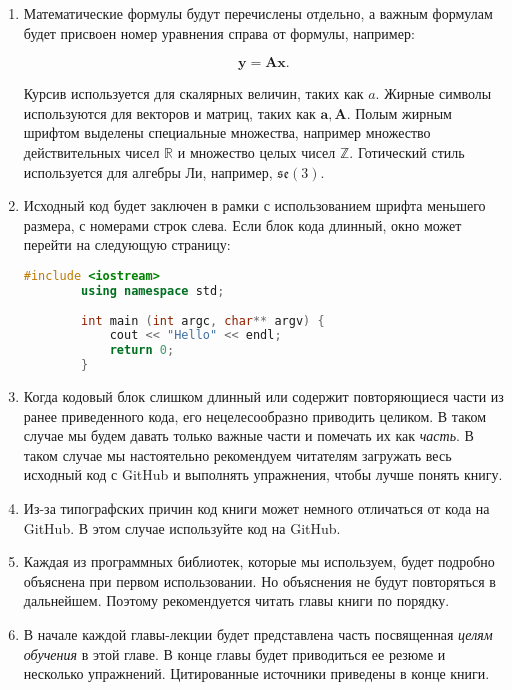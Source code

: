 \begin{Russian}
    \begin{enumerate}
    	\item Математические формулы будут перечислены отдельно, а важным формулам будет присвоен номер уравнения справа от формулы, например:
    
    	\begin{equation}
    	   \mathbf{y} =\mathbf{A}\mathbf{x}.
    	\end{equation}
    
    	Курсив используется для скалярных величин, таких как $a$. Жирные символы используются для векторов и матриц, таких как $\mathbf{a}, \mathbf{A}$. Полым жирным шрифтом выделены специальные множества, например множество действительных чисел $\mathbb{R}$ и множество целых чисел $\mathbb{Z}$. Готический стиль используется для алгебры Ли, например, $\mathfrak{se}(3)$.
    
    	\item Исходный код будет заключен в рамки с использованием шрифта меньшего размера, с номерами строк слева. Если блок кода длинный, окно может перейти на следующую страницу:
    	\begin{lstlisting}[language=C++,caption=Code example:]
    	#include <iostream>
    	using namespace std;
    
    	int main (int argc, char** argv) {
    		cout << "Hello" << endl;
    		return 0;
    	}
    	\end{lstlisting}
    
    	\item Когда кодовый блок слишком длинный или содержит повторяющиеся части из ранее приведенного кода, его нецелесообразно приводить целиком. В таком случае мы будем давать только важные части и помечать их как \textit{часть}. В таком случае мы настоятельно рекомендуем читателям загружать весь исходный код с GitHub и выполнять упражнения, чтобы лучше понять книгу.
    
    	\item Из-за типографских причин код книги может немного отличаться от кода на GitHub. В этом случае используйте код на GitHub.
    
    	\item Каждая из программных библиотек, которые мы используем, будет подробно объяснена при первом использовании. Но объяснения не будут повторяться в дальнейшем. Поэтому рекомендуется читать главы книги по порядку.
    
    	\item В начале каждой главы-лекции будет представлена часть посвященная \textit{целям обучения} в этой главе. В конце главы будет приводиться ее резюме и несколько упражнений. Цитированные источники приведены в конце книги.
     

\end{enumerate}
\end{Russian}
